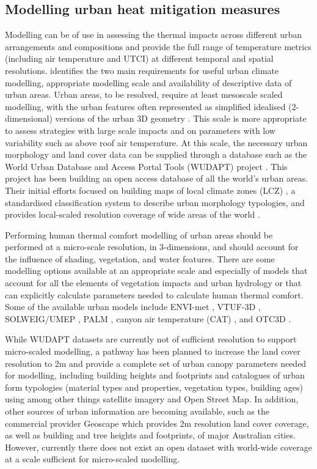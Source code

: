 \documentclass[final,3p,times,authoryear]{elsarticle}
\begin{document}
\subsection{Modelling urban heat mitigation measures}

Modelling can be of use in assessing the thermal impacts across different urban arrangements and compositions and provide the full range of temperature metrics (including air temperature and UTCI) at different temporal and spatial resolutions. \cite{Masson2020} identifies the two main requirements for useful urban climate modelling, appropriate modelling scale and availability of descriptive data of urban areas. Urban areas, to be resolved, require at least mesoscale scaled modelling, with the urban features often represented as simplified idealised (2-dimensional) versions of the urban 3D geometry \citep{Masson2005}. This scale is more appropriate to assess strategies with large scale impacts and on parameters with low variability such as above roof air temperature. At this scale, the necessary urban morphology and land cover data can be supplied through a database such as the World Urban Database and Access Portal Tools (WUDAPT) project \citep{Ching2018a}. This project has been building an open access database of all the world's urban areas. Their initial efforts focused on building maps of local climate zones (LCZ) \citep{Stewart2012b}, a standardised classification system to describe urban morphology typologies, and provides local-scaled resolution coverage of wide areas of the world \citep{Demuzere2019}.


Performing human thermal comfort modelling of urban areas should be performed at a micro-scale resolution, in 3-dimensions, and should account for the influence of shading, vegetation, and water features. There are some modelling options available at an appropriate scale and especially of models that account for all the elements of vegetation impacts and urban hydrology or that can explicitly calculate parameters needed to calculate human thermal comfort. Some of the available urban models include ENVI-met \citep{Bruse1999}, VTUF-3D \citep{Nice2018a}, SOLWEIG/UMEP \citep{Lindberg2018}, PALM \citep{Dominik2019}, canyon air temperature (CAT) \citep{Erell2006}, and OTC3D \citep{Nazarian2018}. 

While WUDAPT datasets are currently not of sufficient resolution to support micro-scaled modelling, a pathway has been planned \citep{Ching2019} to increase the land cover resolution to 2m and provide a complete set of urban canopy parameters needed for modelling, including building heights and footprints and catalogues of urban form typologies (material types and properties, vegetation types, building ages) using among other things satellite imagery and Open Street Map. In addition, other sources of urban information are becoming available, such as the commercial provider Geoscape \citep{Geoscape2020} which provides 2m resolution land cover coverage, as well as building and tree heights and footprints, of major Australian cities. However, currently there does not exist an open dataset with world-wide coverage at a scale sufficient for micro-scaled modelling. 
\end{document}
